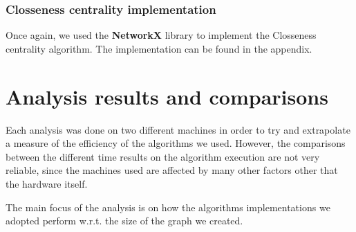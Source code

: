     \subsubsection*{Closseness centrality implementation}
    Once again, we used the \textbf{NetworkX} library to implement the Closseness centrality algorithm.
    The implementation can be found in the appendix.

    \section{Analysis results and comparisons}
    Each analysis was done on two different machines in order to try and extrapolate a measure of the efficiency of the algorithms we used. 
    However, the comparisons between the different time results on the algorithm execution are not very reliable, since the machines used
    are affected by many other factors other that the hardware itself. 

    The main focus of the analysis is on how the algorithms implementations we adopted perform w.r.t. the size of the graph we created.
